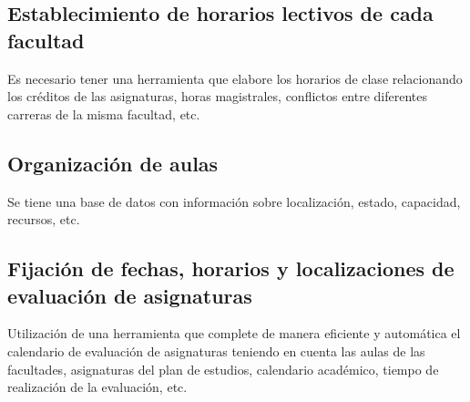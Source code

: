 \documentclass[11pt,a4paper,spanish,twoside]{book}
\begin{document}
\subsection{Establecimiento de horarios lectivos de cada facultad}
Es necesario tener una herramienta que elabore los horarios de clase
relacionando los créditos de las asignaturas, horas magistrales, conflictos
entre diferentes carreras de la misma facultad, etc.

\subsection{Organización de aulas}
Se tiene una base de datos con información sobre localización, estado,
capacidad, recursos, etc. 

\subsection{Fijación de  fechas, horarios y localizaciones de evaluación de
  asignaturas}
Utilización de una herramienta que complete de manera eficiente y automática
el calendario de evaluación de asignaturas teniendo en cuenta las aulas de
las facultades, asignaturas del plan de estudios, calendario académico,
tiempo de realización de la evaluación, etc.
\end{document}
